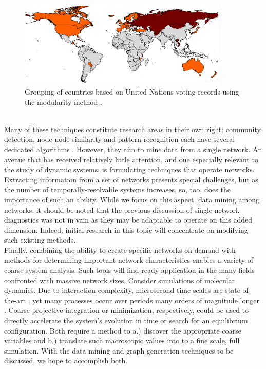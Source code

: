 \documentclass[11pt]{article}
\begin{document}
\begin{figure}[h!]
  \centering
  \includegraphics[width=10cm]{unCommunityDetection}
  \caption{Grouping of countries based on United Nations voting records using the modularity method \cite{porter}.}
  \label{fig:un}
\end{figure}
\vspace{1mm}\\
Many of these techniques constitute research areas in their own right: community detection, node-node similarity and pattern recognition each have several dedicated algorithms \cite{Zager2008} \cite{Kleinberg1999} \cite{Newman2004} \cite{neuralnetwork pattern recog}. However, they aim to mine data from a single network. An avenue that has received relatively little attention, and one especially relevant to the study of dynamic systems, is formulating techniques that operate  networks. Extracting information from a set of networks presents special challenges, but as the number of temporally-resolvable systems increases, so, too, does the importance of such an ability. While we focus on this aspect, data mining among networks, it should be noted that the previous discussion of single-network diagnostics was not in vain as they may be adaptable to operate on this added dimension. Indeed, initial research in this topic will concentrate on modifying such existing methods. \vspace{1mm}\\
Finally, combining the ability to create specific networks on demand with methods for determining important network characteristics enables a variety of coarse system analysis. Such tools will find ready application in the many fields confronted with massive network sizes. Consider simulations of molecular dynamics. Due to interaction complexity, microsecond time-scales are state-of-the-art \cite{Maragakis2010}, yet many processes occur over periods many orders of magnitude longer \cite{glass equilibration}. Coarse projective integration or minimization, respectively, could be used to directly accelerate the system's evolution in time or search for an equilibrium configuration. Both require a method to a.) discover the appropriate coarse variables and b.) translate such macroscopic values into to a fine scale, full simulation. With the data mining and graph generation techniques to be discussed, we hope to accomplish both. \vspace{1mm}\\
\end{document}
